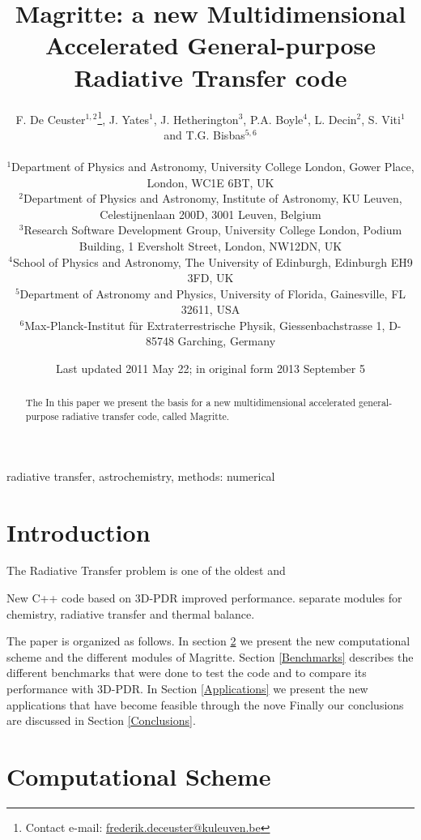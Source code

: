 \documentclass[a4paper,fleqn,usenatbib]{mnras}
\title[Magritte]{Magritte: a new Multidimensional Accelerated General-purpose Radiative Transfer code}
\author[F. De Ceuster et al.]{ F. De Ceuster$^{1,2}$\thanks{Contact e-mail: \href{frederik.deceuster@kuleuven.be}{frederik.deceuster@kuleuven.be}}, J. Yates$^{1}$, J. Hetherington$^{3}$, P.A. Boyle$^{4}$, L. Decin$^{2}$, S. Viti$^{1}$ and T.G. Bisbas$^{5,6}$
\\ \\
$^{1}$Department of Physics and Astronomy, University College London, Gower Place, London, WC1E 6BT, UK \\
$^{2}$Department of Physics and Astronomy, Institute of Astronomy, KU Leuven, Celestijnenlaan 200D, 3001 Leuven, Belgium \\
$^{3}$Research Software Development Group, University College London, Podium Building, 1 Eversholt Street, London, NW12DN, UK \\
$^{4}$School of Physics and Astronomy, The University of Edinburgh, Edinburgh EH9 3FD, UK \\
$^{5}$Department of Astronomy and Physics, University of Florida, Gainesville, FL 32611, USA \\
$^{6}$Max-Planck-Institut f\"ur Extraterrestrische Physik, Giessenbachstrasse 1, D-85748 Garching, Germany}
\date{Last updated 2011 May 22; in original form 2013 September 5}
\begin{document}
\label{firstpage}
\pagerange{\pageref{firstpage}--\pageref{lastpage}}
\maketitle

\begin{abstract}
The  In this paper we present the basis for a new multidimensional accelerated general-purpose radiative transfer code, called Magritte.
\end{abstract}

\begin{keywords}
radiative transfer, astrochemistry, methods: numerical
\end{keywords}



\begingroup
\let\clearpage\relax
\endgroup
\newpage


\section{Introduction}

The Radiative Transfer problem is one of the oldest and

New C++ code based on 3D-PDR \citet{Bisbas2012} improved performance. separate modules for chemistry, radiative transfer and thermal balance.

The paper is organized as follows. In section \ref{CompSc} we present the new computational scheme and the different modules of Magritte. Section \ref{Benchmarks} describes the different benchmarks that were done to test the code and to compare its performance with 3D-PDR. In Section \ref{Applications} we present the new applications that have become feasible through the nove Finally our conclusions are discussed in Section \ref{Conclusions}.


\section{Computational Scheme}
\label{CompSc}
\end{document}
